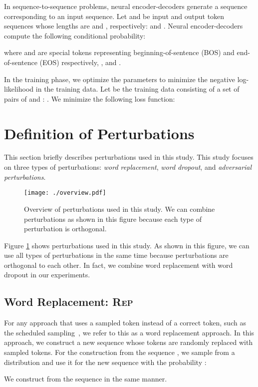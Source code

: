 \documentclass[11pt]{article}
\begin{document}
In sequence-to-sequence problems, neural encoder-decoders generate a sequence corresponding to an input sequence.
Let  and  be input and output token sequences whose lengths are  and , respectively:  and .
Neural encoder-decoders compute the following conditional probability:

where  and  are special tokens representing beginning-of-sentence (BOS) and end-of-sentence (EOS) respectively, , and .


In the training phase, we optimize the parameters  to minimize the negative log-likelihood in the training data.
Let  be the training data consisting of a set of pairs of  and : .
We minimize the following loss function:



\section{Definition of Perturbations}\label{sec:perturbation}
This section briefly describes perturbations used in this study.
This study focuses on three types of perturbations: \textit{word replacement}, \textit{word dropout}, and \textit{adversarial perturbations}.
\begin{figure}[!t]
  \centering 
  \texttt{[image: ./overview.pdf]}
   \caption{Overview of perturbations used in this study. We can combine perturbations as shown in this figure because each type of perturbation is orthogonal.}
   \label{fig:overview}
\end{figure}
Figure \ref{fig:overview} shows perturbations used in this study.
As shown in this figure, we can use all types of perturbations in the same time because perturbations are orthogonal to each other.
In fact, we combine word replacement with word dropout in our experiments.


\subsection{Word Replacement: \textsc{Rep}}
For any approach that uses a sampled token instead of a correct token, such as the scheduled sampling~\cite{NIPS2015_5956}, we refer to this as a word replacement approach.
In this approach, we construct a new sequence whose tokens are randomly replaced with sampled tokens.
For the construction from the sequence , we sample  from a distribution  and use it for the new sequence  with the probability :

We construct  from the sequence  in the same manner.
\end{document}
